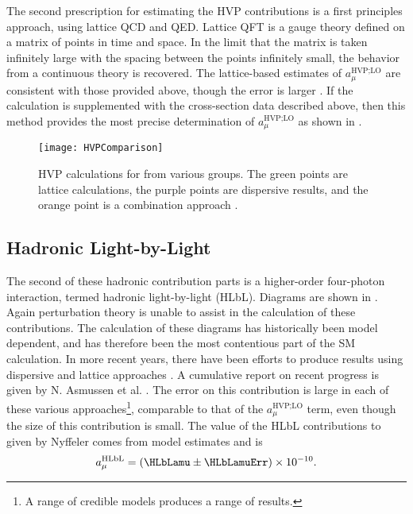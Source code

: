 The second prescription for estimating the HVP contributions is a first principles approach, using lattice QCD and QED. Lattice QFT is a gauge theory defined on a matrix of points in time and space. In the limit that the matrix is taken infinitely large with the spacing between the points infinitely small, the behavior from a continuous theory is recovered. The lattice-based estimates of $a_{\mu}^{\text{HVP;LO}}$ are consistent with those provided above, though the error is larger \cite{Lattice}. If the calculation is supplemented with the cross-section data described above, then this method provides the most precise determination of $a_{\mu}^{\text{HVP;LO}}$ as shown in .

\begin{figure}
    \centering
    \texttt{[image: HVPComparison]}
    \caption[HVP calculations for \amu from various groups]{HVP calculations for \amu from various groups. The green points are lattice calculations, the purple points are dispersive results, and the orange point is a combination approach \cite{Lattice}.}
    \label{fig:HVPComparison}
\end{figure}


\subsection*{Hadronic Light-by-Light}
\label{subsec:HLbL}

The second of these hadronic contribution parts is a higher-order four-photon interaction, termed hadronic light-by-light (HLbL). Diagrams are shown in . Again perturbation theory is unable to assist in the calculation of these contributions. The calculation of these diagrams has historically been model dependent, and has therefore been the most contentious part of the SM calculation. In more recent years, there have been efforts to produce results using dispersive \cite{Colangelo:2014dfa,Colangelo:2015ama,Colangelo:2017qdm} and lattice approaches \cite{Blum:2015gfa,Blum:2016lnc,Blum:2017cer}. A cumulative report on recent progress is given by N. Asmussen et al. \cite{HLbL1}. The error on this contribution is large in each of these various approaches\footnote{A range of credible models produces a range of results.}, comparable to that of the $a_{\mu}^{\text{HVP;LO}}$ term, even though the size of this contribution is small. The value of the HLbL contributions to \amu given by Nyffeler \cite{Nyffeler:2016gnb} comes from model estimates and is 
		\begin{align}
            a_{\mu}^{\text{HLbL}} = (\HLbLamu \pm \HLbLamuErr) \times 10^{-10}.
		\end{align}


